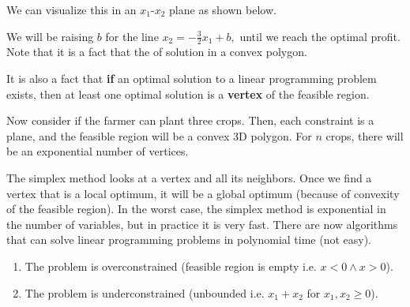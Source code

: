 \documentclass[a4paper,12pt]{article}
\begin{document}
We can visualize this in an $x_1$-$x_2$ plane as shown below.
\begin{center}
\end{center}
We will be raising $b$ for the line $x_2=-\frac{3}{2}x_1+b,$ until we reach the optimal profit. Note that it is a fact that the  of solution in a convex polygon. 

It is also a fact that \textbf{if} an optimal solution to a linear programming problem exists, then at least one optimal solution is a \textbf{vertex} of the feasible region.

Now consider if the farmer can plant three crops. Then, each constraint is a plane, and the feasible region will be a convex 3D polygon. For $n$ crops, there will be an exponential number of vertices. 

The simplex method looks at a vertex and all its neighbors. Once we find a vertex that is a local optimum, it will be a global optimum (because of convexity of the feasible region). In the worst case, the simplex method is exponential in the number of variables, but in practice it is very fast. There are now algorithms that can solve linear programming problems in polynomial time (not easy).

\begin{enumerate}
    \item The problem is overconstrained (feasible region is empty i.e. $x<0\land x>0$).
    \item The problem is underconstrained (unbounded i.e. $x_1+x_2$ for $x_1,x_2\geq 0$).
\end{enumerate}
\end{document}
